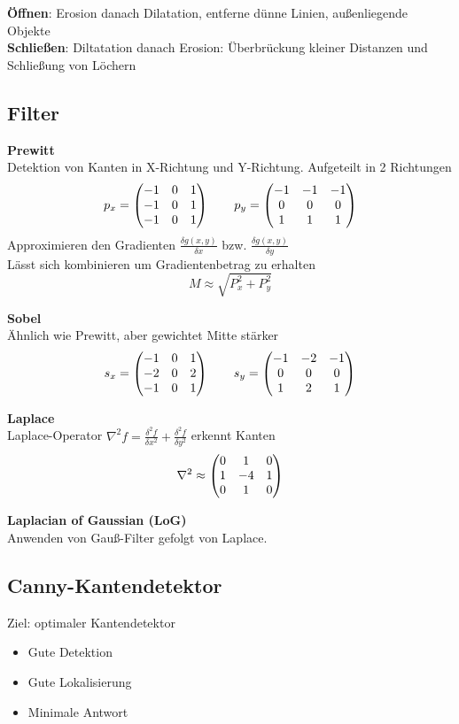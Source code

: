 \textbf{Öffnen}: Erosion danach Dilatation, entferne dünne Linien, außenliegende Objekte\\
\textbf{Schließen}: Diltatation danach Erosion: Überbrückung kleiner Distanzen und Schließung von Löchern\\

\subsection{Filter}
\textbf{Prewitt}\\
Detektion von Kanten in X-Richtung und Y-Richtung. Aufgeteilt in 2 Richtungen
\[p_x = \begin{pmatrix}-1 & 0 & 1\\-1 & 0 & 1\\ -1 & 0 & 1\\\end{pmatrix} \qquad p_y = \begin{pmatrix}-1 & -1 & -1\\ 0 & 0 & 0\\ 1& 1 & 1\\\end{pmatrix}\]
Approximieren den Gradienten \(\frac{\delta g(x, y)}{\delta x}\) bzw. \(\frac{\delta g(x, y)}{\delta y}\)\\
Lässt sich kombinieren um Gradientenbetrag zu erhalten
\[M \approx \sqrt{P_x^2 + P_y^2}\]

\textbf{Sobel}\\
Ähnlich wie Prewitt, aber gewichtet Mitte stärker
\[s_x = \begin{pmatrix}-1 & 0 & 1\\-2 & 0 & 2\\ -1 & 0 & 1\\\end{pmatrix} \qquad s_y = \begin{pmatrix}-1 & -2 & -1\\ 0 & 0 & 0\\ 1& 2 & 1\\\end{pmatrix}\]

\textbf{Laplace}\\
Laplace-Operator \(\nabla^2 f= \frac{\delta^2 f}{\delta x^2}+ \frac{\delta^2 f}{\delta y^2}\) erkennt Kanten\\
\[\nabla^2 \approx \begin{pmatrix}0 & 1 & 0 \\ 1 & -4 & 1 \\ 0 & 1 & 0\end{pmatrix}\]

\textbf{Laplacian of Gaussian (LoG)}\\
Anwenden von Gauß-Filter gefolgt von Laplace.

\subsection{Canny-Kantendetektor}
Ziel: optimaler Kantendetektor
\begin{itemize}
\item Gute Detektion
\item Gute Lokalisierung
\item Minimale Antwort
\end{itemize}

